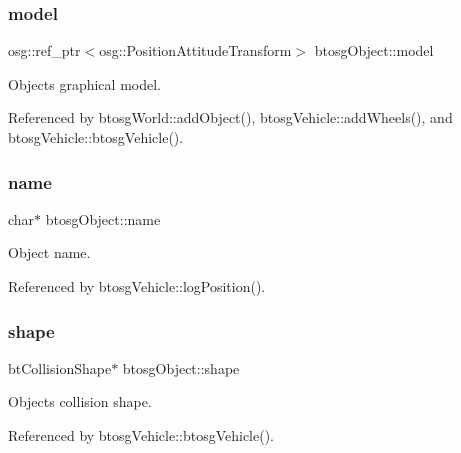 \subsubsection{\texorpdfstring{model}{model}}
{\footnotesize\ttfamily osg\+::ref\+\_\+ptr$<$osg\+::\+Position\+Attitude\+Transform$>$ btosg\+Object\+::model\hspace{0.3cm}{\ttfamily [inherited]}}



Object\textquotesingle{}s graphical model. 



Referenced by btosg\+World\+::add\+Object(), btosg\+Vehicle\+::add\+Wheels(), and btosg\+Vehicle\+::btosg\+Vehicle().

\mbox{\label{classbtosgObject_a12396e1362797a75473a2e833b579cc9}} 
\subsubsection{\texorpdfstring{name}{name}}
{\footnotesize\ttfamily char$\ast$ btosg\+Object\+::name\hspace{0.3cm}{\ttfamily [inherited]}}



Object name. 



Referenced by btosg\+Vehicle\+::log\+Position().

\mbox{\label{classbtosgObject_a0f6a8da01cf643c321bffe86e42604b0}} 
\subsubsection{\texorpdfstring{shape}{shape}}
{\footnotesize\ttfamily bt\+Collision\+Shape$\ast$ btosg\+Object\+::shape\hspace{0.3cm}{\ttfamily [inherited]}}



Object\textquotesingle{}s collision shape. 



Referenced by btosg\+Vehicle\+::btosg\+Vehicle().




